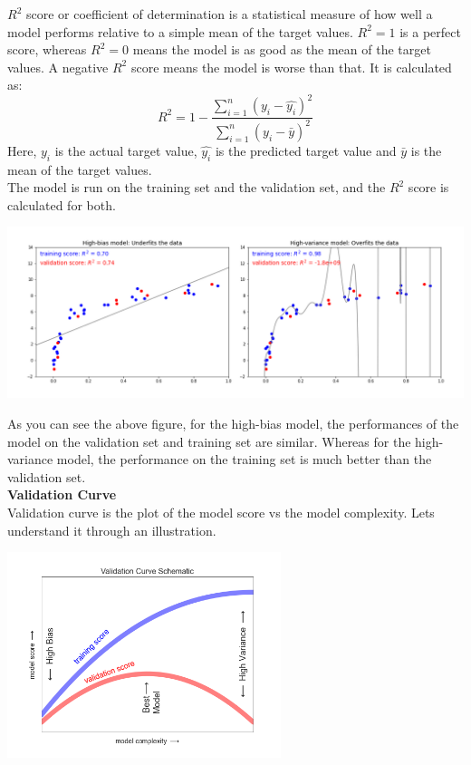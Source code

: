 \documentclass[12pt]{article}
\begin{document}
\newline
$R^2$ score or coefficient of determination is a statistical measure of how well a model performs relative to a simple mean of the target values. $R^2=1$ is a perfect score, whereas $R^2=0$ means the model is as good as the mean of the target values. A negative $R^2$ score means the model is worse than that. It is calculated as:
\begin{equation}
    R^2 = 1 - \frac{\sum_{i=1}^{n} (y_i - \hat{y_i})^2}{\sum_{i=1}^{n} (y_i - \bar{y})^2}
\end{equation}
Here, $y_i$ is the actual target value, $\hat{y_i}$ is the predicted target value and $\bar{y}$ is the mean of the target values.\\
\newpage
The model is run on the training set and the validation set, and the $R^2$ score is calculated for both. 
\begin{center}
    \includegraphics*[width=17cm]{r2.png}\\
\end{center}
As you can see the above figure, for the high-bias model, the performances of the model on the validation set and training set are similar. Whereas for the high-variance model, the performance on the training set is much better than the validation set. \\
\newline
\textbf{Validation Curve} \\
Validation curve is the plot of the model score vs the model complexity. Lets understand it through an illustration.
\begin{center}
    \includegraphics*[width=8cm]{validation-curve.png}\\
\end{center}
\end{document}
